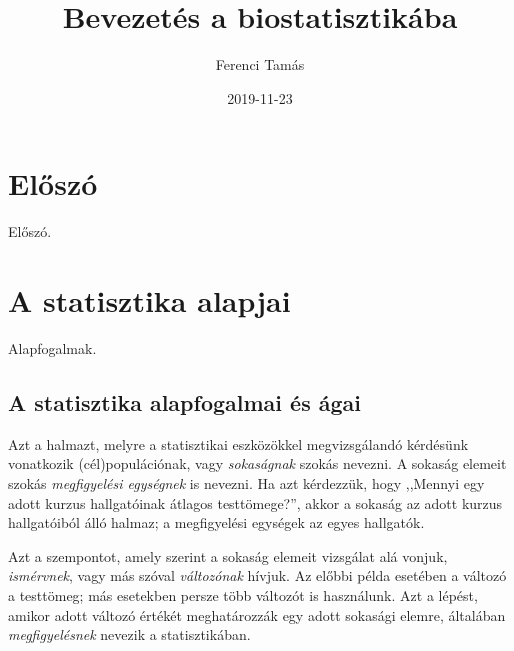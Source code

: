 \documentclass[]{book}
\title{Bevezetés a biostatisztikába}
\author{Ferenci Tamás}
\date{2019-11-23}
\begin{document}
\maketitle

{
\setcounter{tocdepth}{1}
\tableofcontents
}
\hypertarget{elux151szuxf3}{%
\chapter{Előszó}\label{elux151szuxf3}}

Előszó.

\hypertarget{a-statisztika-alapjai}{%
\chapter{A statisztika alapjai}\label{a-statisztika-alapjai}}

Alapfogalmak.

\hypertarget{a-statisztika-alapfogalmai-uxe9s-uxe1gai}{%
\section{A statisztika alapfogalmai és ágai}\label{a-statisztika-alapfogalmai-uxe9s-uxe1gai}}

Azt a halmazt, melyre a statisztikai eszközökkel megvizsgálandó kérdésünk vonatkozik (cél)populációnak, vagy \emph{sokaságnak} szokás nevezni. A sokaság elemeit szokás \emph{megfigyelési egységnek} is nevezni. Ha azt kérdezzük, hogy ,,Mennyi egy adott kurzus hallgatóinak átlagos testtömege?'', akkor a sokaság az adott kurzus hallgatóiból álló halmaz; a megfigyelési egységek az egyes hallgatók.

Azt a szempontot, amely szerint a sokaság elemeit vizsgálat alá vonjuk, \emph{ismérvnek}, vagy más szóval \emph{változónak} hívjuk. Az előbbi példa esetében a változó a testtömeg; más esetekben persze több változót is használunk. Azt a lépést, amikor adott változó értékét meghatározzák egy adott sokasági elemre, általában \emph{megfigyelésnek} nevezik a statisztikában.
\end{document}
